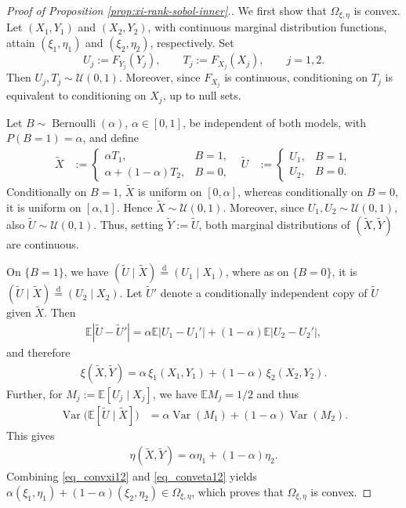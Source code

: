 \documentclass{article}
\newcommand{\Var}{\operatorname{Var}}
\newcommand{\E}{\mathbb{E}}
\newcommand{\cU}{\mathcal{U}}
\newcommand{\eqd}{\stackrel{\mathrm{d}}=}
\begin{document}
\begin{proof}[Proof of Proposition \ref{prop:xi-rank-sobol-inner}.]

We first show that \(\Omega_{\xi,\eta}\) is convex.
Let \((X_1,Y_1)\) and \((X_2,Y_2)\), with continuous marginal distribution functions, attain \((\xi_1,\eta_1)\) and \((\xi_2,\eta_2)\), respectively.
Set
\[
    U_j:=F_{Y_j}(Y_j),
    \qquad
    T_j:=F_{X_j}(X_j),
    \qquad j=1,2.
\]
Then \(U_j,T_j\sim\cU(0,1)\).
Moreover, since \(F_{X_j}\) is continuous, conditioning on \(T_j\) is equivalent to conditioning on \(X_j\), up to null sets.

Let \(B\sim\operatorname{Bernoulli}(\alpha)\), \(\alpha\in[0,1]\), be independent of both models, with \(P(B=1)=\alpha\), and define
\begin{align*}
    \widetilde X
    &:=
    \begin{cases}
        \alpha T_1, & B=1,\\
        \alpha+(1-\alpha)T_2, & B=0,
    \end{cases}
    &
    \widetilde U
    &:=
    \begin{cases}
        U_1, & B=1,\\
        U_2, & B=0.
    \end{cases}
\end{align*}
Conditionally on \(B=1\), \(\widetilde X\) is uniform on \([0,\alpha]\), whereas conditionally on \(B=0\), it is uniform on \([\alpha,1]\).
Hence \(\widetilde X\sim\cU(0,1)\).
Moreover, since \(U_1,U_2\sim\cU(0,1)\), also \(\widetilde U\sim\cU(0,1)\).
Thus, setting \(\widetilde Y:=\widetilde U\), both marginal distributions of \((\widetilde X,\widetilde Y)\) are continuous.

On \(\{B=1\}\), we have \((\widetilde{U}\mid \widetilde{X}) \eqd (U_1\mid X_1)\), where as on \(\{B=0\}\), it is \((\widetilde{U}\mid \widetilde{X}) \eqd (U_2\mid X_2)\).
Let \(\widetilde U'\) denote a conditionally independent copy of \(\widetilde U\) given \(\widetilde X\).
Then
\begin{align*}
    \E|\widetilde U-\widetilde U'|
    =
    \alpha\E|U_1-U_1'|
    +(1-\alpha)\E|U_2-U_2'|,
\end{align*}
and therefore
\begin{align}\label{eq_convxi12}
    \xi(\widetilde X,\widetilde Y)
    =
    \alpha\,\xi_1(X_1,Y_1)+(1-\alpha)\,\xi_2(X_2,Y_2).
\end{align}
Further, for \(M_j:=\E[U_j\mid X_j]\), we have \(\E M_j=1/2\) and thus
\begin{align*}
    \Var\bigl(\E[\widetilde U\mid\widetilde X]\bigr)
    &=
    \alpha\Var(M_1)
    +(1-\alpha)\Var(M_2).
\end{align*}
This gives
\begin{align}\label{eq_conveta12}
    \eta(\widetilde X,\widetilde Y)
    =
    \alpha\eta_1+(1-\alpha)\eta_2.
\end{align}
Combining \eqref{eq_convxi12} and \eqref{eq_conveta12} yields \(\alpha(\xi_1,\eta_1) +(1-\alpha)(\xi_2,\eta_2) \in\Omega_{\xi,\eta}\), which proves that \(\Omega_{\xi,\eta}\) is convex.


\end{proof}
\end{document}
